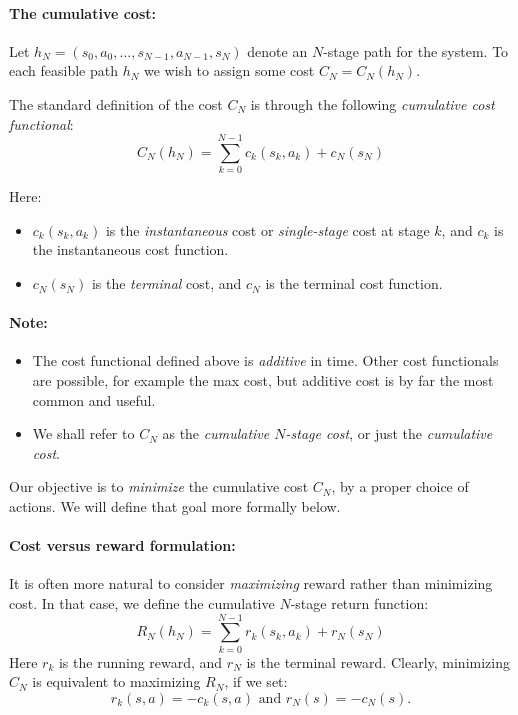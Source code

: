 \paragraph{The cumulative cost:}  Let ${h_N} = ({s_0},{a_0}, \ldots ,{s_{N - 1}},{a_{N - 1}},{s_N})$ denote an $N$-stage path for the system. To each feasible path ${h_N}$ we wish to assign some cost ${C_N} = {C_N}({h_N})$.

The standard definition of the cost ${C_N}$ is through the following \emph{cumulative cost functional}:
\[{C_N}({h_N}) = \sum\limits_{k = 0}^{N - 1} {{c_k}({s_k},{a_k}) + {c_N}({s_N})} \]

Here:
 	\begin{itemize}
    \item ${c_k}({s_k},{a_k})$ is the \emph{instantaneous}  cost or \emph{single-stage }cost at stage $k$, and ${c_k}$ is the instantaneous cost function.
    \item ${c_N}({s_N})$ is the \emph{terminal} cost, and ${c_N}$ is the terminal cost function.
  \end{itemize}

\paragraph{Note:}
\begin{itemize}
  \item The cost functional defined above is \emph{additive} in time. Other cost functionals are possible, for example the max cost, but additive cost is by far the most common and useful.
  \item We shall refer to ${C_N}$ as the \emph{cumulative $N$-stage cost}, or just the \emph{cumulative cost}.
\end{itemize}

Our objective is to \emph{minimize} the cumulative cost ${C_N}$, by a proper choice of actions. We will define that goal more formally below.

\paragraph{Cost versus reward formulation: }It is often more natural to consider \emph{maximizing} reward rather than minimizing cost.  In that case, we define the cumulative $N$-stage return function:
$${R_N}({h_N}) = \sum\limits_{k = 0}^{N - 1} {{r_k}({s_k},{a_k}) + {r_N}({s_N})} $$
Here ${r_k}$ is the running reward, and ${r_N}$ is the terminal reward.
Clearly, minimizing ${C_N}$ is equivalent to maximizing ${R_N}$, if we set:
$${r_k}(s,a) =  - {c_k}(s,a) \text{ and }{r_N}(s) =  - {c_N}(s).$$


